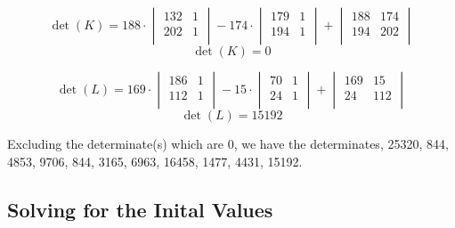\documentclass[12pft, english]{article}
\begin{document}
\begin{multicols}{2}
  \[
    \det(K) =
    188 \cdot
    \begin{vmatrix}
      132 & 1 \\
      202 & 1 \\
    \end{vmatrix}
    -
    174 \cdot
    \begin{vmatrix}
      179 & 1 \\
      194 & 1 \\
    \end{vmatrix}
    +
    \begin{vmatrix}
      188 & 174 \\
      194 & 202 \\
    \end{vmatrix}
  \]
  \[
    \det(K) = 0
  \]

  \[
    \det(L) =
    169 \cdot
    \begin{vmatrix}
      186 & 1 \\
      112 & 1 \\
    \end{vmatrix}
    -
    15 \cdot
    \begin{vmatrix}
      70 & 1 \\
      24 & 1 \\
    \end{vmatrix}
    +
    \begin{vmatrix}
      169 & 15 \\
      24 & 112 \\
    \end{vmatrix}
  \]
  \[
    \det(L) = 15192
  \]

  Excluding the determinate(s) which are 0, we have the determinates, 25320, 844, 4853, 9706, 844, 3165, 6963, 16458, 1477, 4431, 15192.

  \subsection{Solving for the Inital Values}


\end{multicols}
\end{document}
